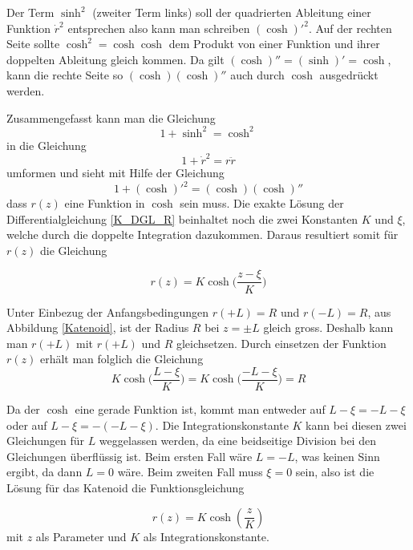 \begin{refsection}
Der Term $\sinh^2$  (zweiter Term links) soll der quadrierten Ableitung einer Funktion ${\dot {r}}^2$ entsprechen also kann man schreiben $(\cosh)'^2$. 
Auf der rechten Seite sollte $\cosh^2=\cosh \cosh$ dem Produkt von einer Funktion und ihrer doppelten Ableitung gleich kommen. Da gilt $(\cosh)''=(\sinh)'=\cosh$, kann die rechte Seite so $(\cosh) (\cosh)''$ auch durch $\cosh$ ausgedrückt werden.


Zusammengefasst kann man die Gleichung 
\begin{equation} \label{K_hTrigo}
1+\sinh^2=\cosh^2
\end{equation}
 in die Gleichung 
 \begin{equation} \label{K_DGL_R2}
1+{\dot {r}}^2=r  \ddot{r}
\end{equation}
 umformen und sieht mit Hilfe der Gleichung 
\begin{equation} \label{K_hTrigoU}
1+(\cosh)'^2=(\cosh) (\cosh)''
\end{equation}
dass $r(z)$ eine Funktion in $\cosh$ sein muss.
Die exakte Lösung der Differentialgleichung \eqref{K_DGL_R} beinhaltet noch die zwei Konstanten $K$ und $\xi$, welche durch die doppelte Integration dazukommen. Daraus resultiert somit für $r(z)$ die Gleichung 

\begin{equation} \label{K_r}
r(z)=K \cosh\bigg(\frac{z-\xi}{K}\bigg)
\end{equation}

Unter Einbezug der Anfangsbedingungen $r(+L)=R$ und $r(-L)=R$, aus Abbildung \ref{Katenoid}, ist der Radius $R$ bei $z= \pm L$ gleich gross. Deshalb kann man $r(+L)$ mit $r(+L)$ und $R$ gleichsetzen. Durch einsetzen der Funktion $r(z)$ erhält man folglich die Gleichung
\begin{equation} \label{K_rL}
K \cosh\bigg(\frac{L-\xi}{K}\bigg)=K \cosh\bigg(\frac{-L-\xi}{K}\bigg)=R
\end{equation}

Da der $\cosh$ eine gerade Funktion ist, kommt man entweder auf $L-\xi=-L-\xi$ oder auf $L-\xi=-(-L-\xi)$. Die Integrationskonstante $K$ kann bei diesen zwei Gleichungen für $L$ weggelassen werden, da eine beidseitige Division bei den Gleichungen überflüssig ist.
Beim ersten Fall wäre $L=-L$, was keinen Sinn ergibt, da dann $L=0$ wäre. Beim zweiten Fall muss $\xi=0$ sein, also ist die Lösung für das Katenoid die Funktionsgleichung 

\begin{equation} \label{K_rz}
r(z)=K \cosh\left(\frac{z}{K}\right)
\end{equation}
mit $z$ als Parameter und $K$ als Integrationskonstante.

\end{refsection}
